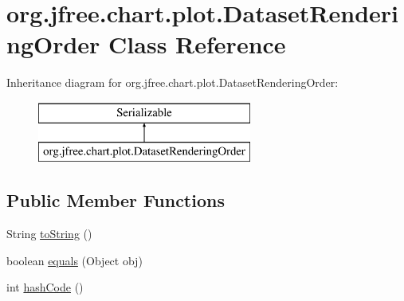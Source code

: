 \hypertarget{classorg_1_1jfree_1_1chart_1_1plot_1_1_dataset_rendering_order}{}\section{org.\+jfree.\+chart.\+plot.\+Dataset\+Rendering\+Order Class Reference}
\label{classorg_1_1jfree_1_1chart_1_1plot_1_1_dataset_rendering_order}
Inheritance diagram for org.\+jfree.\+chart.\+plot.\+Dataset\+Rendering\+Order\+:\begin{figure}[H]
\begin{center}
\leavevmode
\includegraphics[height=2.000000cm]{classorg_1_1jfree_1_1chart_1_1plot_1_1_dataset_rendering_order}
\end{center}
\end{figure}
\subsection*{Public Member Functions}
\begin{DoxyCompactItemize}
\item 
String \mbox{\hyperlink{classorg_1_1jfree_1_1chart_1_1plot_1_1_dataset_rendering_order_aba766d46f7130b6c075c8f981b463800}{to\+String}} ()
\item 
boolean \mbox{\hyperlink{classorg_1_1jfree_1_1chart_1_1plot_1_1_dataset_rendering_order_a75f2a2e5082fd0d4888c405bd9f4dd4a}{equals}} (Object obj)
\item 
int \mbox{\hyperlink{classorg_1_1jfree_1_1chart_1_1plot_1_1_dataset_rendering_order_ade86477a97003f567d9c1c0ce7ef3293}{hash\+Code}} ()
\end{DoxyCompactItemize}
